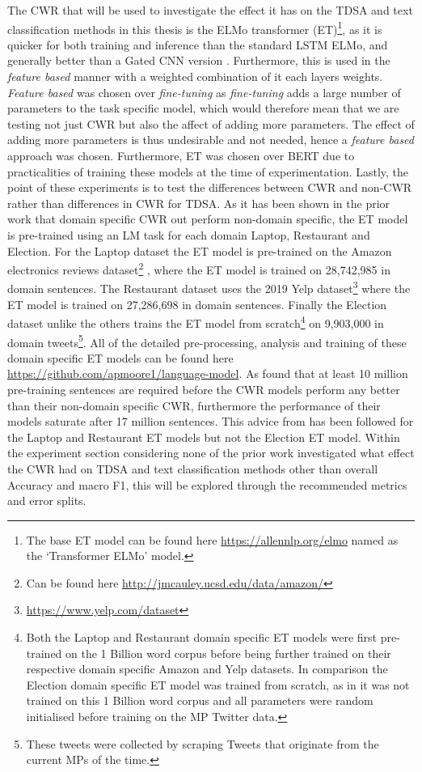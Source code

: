 The CWR that will be used to investigate the effect it has on the TDSA and text classification methods in this thesis is the ELMo transformer (ET)\footnote{The base ET model can be found here \url{https://allennlp.org/elmo} named as the `Transformer ELMo' model.}, as it is quicker for both training and inference than the standard LSTM ELMo, and generally better than a Gated CNN version \citep{peters-etal-2018-dissecting}. Furthermore, this is used in the \textit{feature based} manner with a weighted combination of it each layers weights. \textit{Feature based} was chosen over \textit{fine-tuning} as \textit{fine-tuning} adds a large number of parameters to the task specific model, which would therefore mean that we are testing not just CWR but also the affect of adding more parameters. The effect of adding more parameters is thus undesirable and not needed, hence a \textit{feature based} approach was chosen. Furthermore, ET was chosen over BERT due to practicalities of training these models at the time of experimentation. Lastly, the point of these experiments is to test the differences between CWR and non-CWR rather than differences in CWR for TDSA. As it has been shown in the prior work that domain specific CWR out perform non-domain specific, the ET model is pre-trained using an LM task for each domain Laptop, Restaurant and Election. For the Laptop dataset the ET model is pre-trained on the Amazon electronics reviews dataset\footnote{Can be found here \url{http://jmcauley.ucsd.edu/data/amazon/}} \citep{mcauley2015image}, where the ET model is trained on 28,742,985 in domain sentences. The Restaurant dataset uses the 2019 Yelp dataset\footnote{\url{https://www.yelp.com/dataset}} where the ET model is trained on 27,286,698 in domain sentences. Finally the Election dataset unlike the others trains the ET model from scratch\footnote{Both the Laptop and Restaurant domain specific ET models were first pre-trained on the 1 Billion word corpus \citep{DBLP:conf/interspeech/ChelbaMSGBKR14} before being further trained on their respective domain specific Amazon and Yelp datasets. In comparison the Election domain specific ET model was trained from scratch, as in it was not trained on this 1 Billion word corpus and all parameters were random initialised before training on the MP Twitter data.} on 9,903,000 in domain tweets\footnote{These tweets were collected by scraping Tweets that originate from the current MPs of the time.}. All of the detailed pre-processing, analysis and training of these domain specific ET models can be found here \url{https://github.com/apmoore1/language-model}. As \citet{rietzler2019adapt} found that at least 10 million pre-training sentences are required before the CWR models perform any better than their non-domain specific CWR, furthermore the performance of their models saturate after 17 million sentences. This advice from \citet{rietzler2019adapt} has been followed for the Laptop and Restaurant ET models but not the Election ET model. Within the experiment section considering none of the prior work investigated what effect the CWR had on TDSA and text classification methods other than overall Accuracy and macro F1, this will be explored through the recommended metrics and error splits. 

